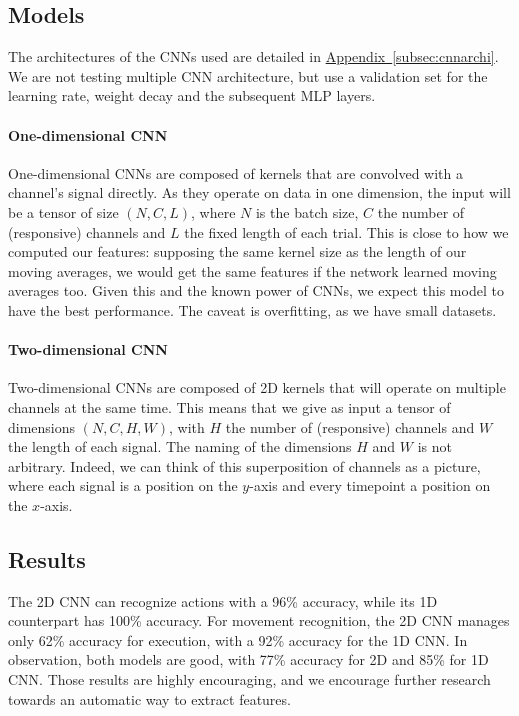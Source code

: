 \documentclass[10pt,conference,compsocconf]{IEEEtran}
\newcommand{\aref}[1]{\hyperref[#1]{Appendix~\ref*{#1}}}
\begin{document}
\subsection{Models}

The architectures of the CNNs used are detailed in \aref{subsec:cnnarchi}. We are not testing multiple CNN architecture, but use a validation set for the learning rate, weight decay and the subsequent MLP layers.

\paragraph{One-dimensional CNN}
One-dimensional CNNs are composed of kernels that are convolved with a channel's signal directly. As they operate on data in one dimension, the input will be a tensor of size \((N, C, L)\), where \(N\) is the batch size, \(C\) the number of (responsive) channels and \(L\) the fixed length of each trial. This is close to how we computed our features: supposing the same kernel size as the length of our moving averages, we would get the same features if the network learned moving averages too. Given this and the known power of CNNs, we expect this model to have the best performance. The caveat is overfitting, as we have small datasets.

\paragraph{Two-dimensional CNN}
Two-dimensional CNNs are composed of 2D kernels that will operate on multiple channels at the same time. This means that we give as input a tensor of dimensions \((N, C, H, W)\), with \(H\) the number of (responsive) channels and \(W\) the length of each signal. The naming of the dimensions \(H\) and \(W\) is not arbitrary. Indeed, we can think of this superposition of channels as a picture, where each signal is a position on the \(y\)-axis and every timepoint a position on the \(x\)-axis.

\subsection{Results}
The 2D CNN can recognize actions with a 96\% accuracy, while its 1D counterpart has 100\% accuracy. For movement recognition, the 2D CNN manages only 62\% accuracy for execution, with a 92\% accuracy for the 1D CNN. In observation, both models are good, with 77\% accuracy for 2D and 85\% for 1D CNN. Those results are highly encouraging, and we encourage further research towards an automatic way to extract features.
\end{document}
